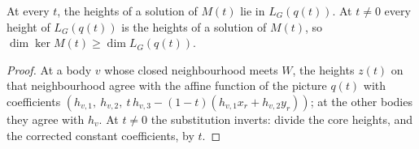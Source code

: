 \begin{lemma}
  \label{lem:pencil-contract-lifting-kernel}
  \leanok
  At every $t$, the heights of a solution of $M(t)$ lie in
  $L_G(q(t))$. At $t \neq 0$ every height of $L_G(q(t))$ is the heights
  of a solution of $M(t)$, so $\dim \ker M(t) \ge \dim L_G(q(t))$.
\end{lemma}
\begin{proof}
  \leanok
  At a body $v$ whose closed neighbourhood meets $W$, the heights $z(t)$
  on that neighbourhood agree with the affine function of the picture
  $q(t)$ with coefficients
  $(h_{v,1},\ h_{v,2},\ t\,h_{v,3} - (1 - t)(h_{v,1} x_r + h_{v,2} y_r))$;
  at the other bodies they agree with $h_v$. At $t \neq 0$ the
  substitution inverts: divide the core heights, and the corrected
  constant coefficients, by $t$.
\end{proof}

